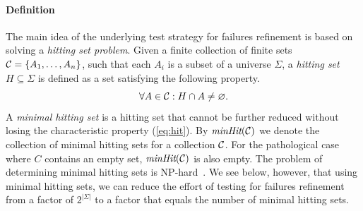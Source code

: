 \documentclass[3p,times]{elsarticle}
\newcommand{\minhits}{\text{\it minHit}}
\begin{document}
\paragraph{Definition} The main idea of the underlying test strategy for failures
refinement is based on solving a \emph{hitting set problem}. Given a finite
collection of finite sets ${\cal C} = \{ A_1,\dots,A_n\}$, such that each
$A_i$ is a subset of a universe $\Sigma$, a \emph{hitting set}
$H\subseteq\Sigma$ is defined as a set satisfying the following property.
%
\begin{equation}
  \label{eq:hit}
  \forall A\in {\cal C}: H\cap A \neq\varnothing.
\end{equation}
%
A \emph{minimal hitting set} is a hitting set that cannot be further reduced
without losing the characteristic property (\ref{eq:hit}). By $\minhits({\cal
C})$ we denote the collection of minimal hitting sets for a collection ${\cal
C}$. For the pathological case where $C$ contains an empty set,
$\minhits({\cal C})$ is also empty. The problem of determining minimal hitting sets is %
NP-hard~\cite{5533149}. We see below, however, that using minimal hitting
sets, we can reduce the effort of testing for failures refinement from a
factor of $2^{|\Sigma|}$ to a factor that equals the number of minimal
hitting sets.

\end{document}
